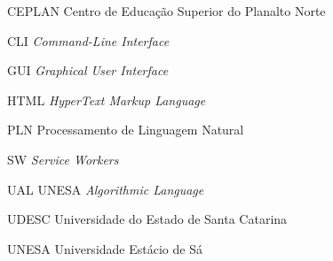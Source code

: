 
\begin{siglas}
  \item[CEPLAN] Centro de Educação Superior do Planalto Norte
  \item[CLI] \textit{Command-Line Interface}
  \item[GUI] \textit{Graphical User Interface}
  \item[HTML] \textit{HyperText Markup Language}
  \item[PLN] Processamento de Linguagem Natural
  \item[SW] \textit{Service Workers}
  \item[UAL] UNESA \textit{Algorithmic Language}
  \item[UDESC] Universidade do Estado de Santa Catarina
  \item[UNESA] Universidade Estácio de Sá
\end{siglas}
